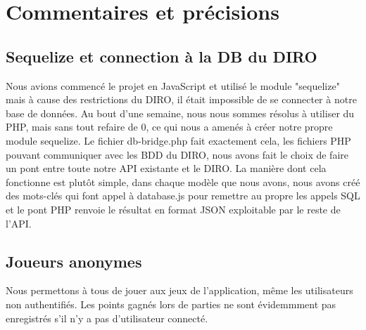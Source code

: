 \documentclass{article}
\begin{document}
\section{Commentaires et précisions}

\subsection{Sequelize et connection à la DB du DIRO}
Nous avions commencé le projet en JavaScript et utilisé le module "sequelize" mais à cause des restrictions du DIRO, il était impossible de se connecter à notre base de données. Au bout d'une semaine, nous nous sommes résolus à utiliser du PHP, mais sans tout refaire de 0, ce qui nous a amenés à créer notre propre module sequelize.
Le fichier db-bridge.php fait exactement cela, les fichiers PHP pouvant communiquer avec les BDD du DIRO, nous avons fait le choix de faire un pont entre toute notre API existante et le DIRO. La manière dont cela fonctionne est plutôt simple, dans chaque modèle que nous avons, nous avons créé des mots-clés qui font appel à database.js pour remettre au propre les appels SQL et le pont PHP renvoie le résultat en format JSON exploitable par le reste de l'API.

\subsection{Joueurs anonymes}
Nous permettons à tous de jouer aux jeux de l'application, même les utilisateurs non authentifiés. Les points gagnés lors de parties ne sont évidemmment pas enregistrés s'il n'y a pas d'utilisateur connecté.
\end{document}
